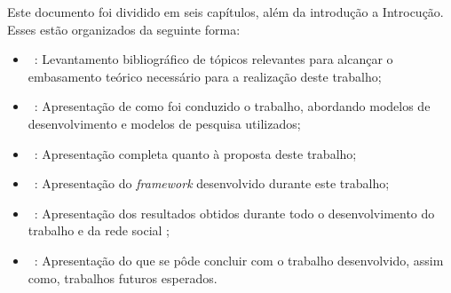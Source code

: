 Este documento foi dividido em seis capítulos, além da introdução a Introcução. Esses estão organizados da seguinte forma:

\begin{itemize}
	\item ~: Levantamento bibliográfico de tópicos relevantes para alcançar o embasamento teórico necessário para a realização deste trabalho;
	\item ~: Apresentação de como foi conduzido o trabalho, abordando modelos de desenvolvimento e modelos de pesquisa utilizados;
	\item ~: Apresentação completa quanto à proposta deste trabalho;
	\item ~: Apresentação do \textit{framework} desenvolvido durante este trabalho;
	\item ~: Apresentação dos resultados obtidos durante todo o desenvolvimento do trabalho e da rede social ;
	\item ~: Apresentação do que se pôde concluir com o trabalho desenvolvido, assim como, trabalhos futuros esperados.
\end{itemize}
